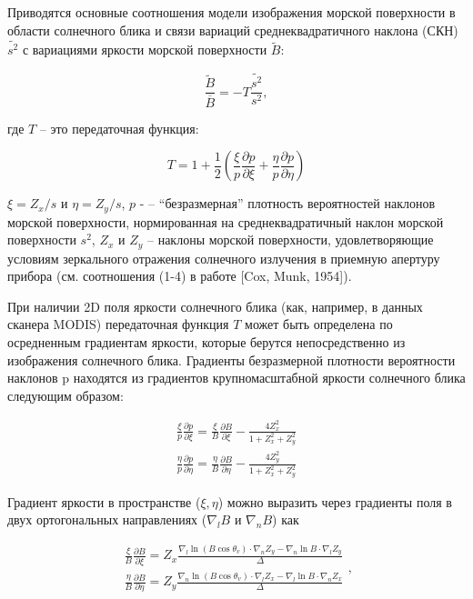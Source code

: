 Приводятся основные соотношения модели изображения морской поверхности в области солнечного блика и связи вариаций среднеквадратичного наклона (СКН) $\widetilde{s^{2} }$ с вариациями яркости морской поверхности $\widetilde{B}$:

\begin{equation} \label{ZEqnNum404712} \frac{\tilde{B}}{\overline{B}} =-T\frac{\widetilde{s^{2} }}{s^{2} } ,  \end{equation} 

где $T$ -- это передаточная функция:

\begin{equation} \label{ZEqnNum527172} T=1+\frac{1}{2} \left(\frac{\xi }{p} \frac{\partial p}{\partial \xi } +\frac{\eta }{p} \frac{\partial p}{\partial \eta } \right) \end{equation} 

$\xi =Z_{x} /s$ и $\eta =Z_{y} /s$, $p$ - -- ``безразмерная'' плотность вероятностей наклонов морской поверхности, нормированная на среднеквадратичный наклон морской поверхности $s^{2} $, $Z_{x} $ и $Z_{y} $ -- наклоны морской поверхности, удовлетворяющие условиям зеркального отражения солнечного излучения в приемную апертуру прибора (см. соотношения (1-4) в работе [Cox, Munk, 1954]).

При наличии 2D поля яркости солнечного блика (как, например, в данных сканера MODIS) передаточная функция $T$ может быть определена по осредненным градиентам яркости, которые берутся непосредственно из изображения солнечного блика. Градиенты безразмерной плотности вероятности наклонов p находятся из градиентов крупномасштабной яркости солнечного блика следующим образом:

\begin{equation} \label{3)} \begin{array}{l} {\frac{\xi }{p} \frac{\partial p}{\partial \xi } =\frac{\xi }{B} \frac{\partial B}{\partial \xi } -\frac{4Z_{x}^{2} }{1+Z_{x}^{2} +Z_{y}^{2} } } \\ {\frac{\eta }{p} \frac{\partial p}{\partial \eta } =\frac{\eta }{B} \frac{\partial B}{\partial \eta } -\frac{4Z_{y}^{2} }{1+Z_{x}^{2} +Z_{y}^{2} } } \end{array} \end{equation} 

Градиент яркости в пространстве ($\xi ,\eta $) можно выразить через градиенты поля в двух ортогональных направлениях ($\nabla _{l} B$ и $\nabla _{n} B$) как

\begin{equation} \label{4)} \begin{array}{l} {\frac{\xi }{B} \frac{\partial B}{\partial \xi } =Z_{x} \frac{\nabla _{l} \ln (B\cos \theta _{v} )\cdot \nabla _{n} Z_{y}^{} -\nabla _{n} \ln B\cdot \nabla _{l} Z_{y}^{} }{\Delta } } \\ {\frac{\eta }{B} \frac{\partial B}{\partial \eta } =Z_{y} \frac{\nabla _{n} \ln (B\cos \theta _{v} )\cdot \nabla _{l} Z_{x}^{} -\nabla _{l} \ln B\cdot \nabla _{n} Z_{x}^{} }{\Delta } } \end{array},  \end{equation} 

